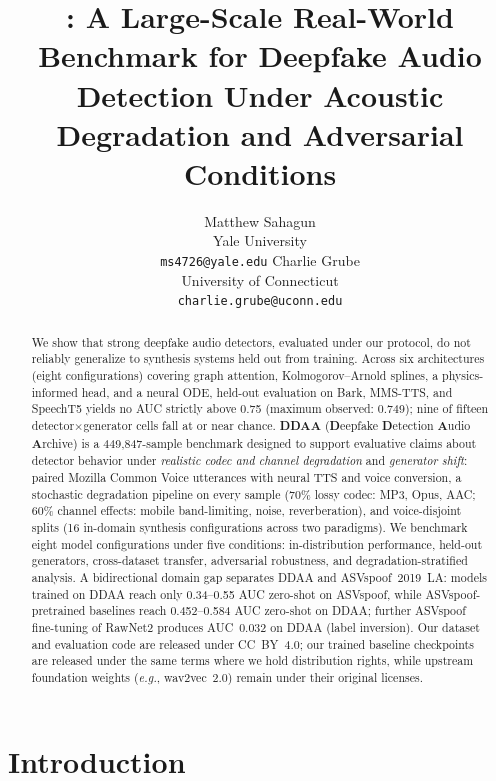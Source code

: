 \documentclass{article}
\title{\ddaa: A Large-Scale Real-World Benchmark for Deepfake Audio\\
  Detection Under Acoustic Degradation and Adversarial Conditions}
\author{%
  Matthew Sahagun \\
  Yale University \\
  \texttt{ms4726@yale.edu}
  \And
  Charlie Grube \\
  University of Connecticut \\
  \texttt{charlie.grube@uconn.edu}
}
\newcommand{\ddaa}{\textsc{DDAA}}
\begin{document}
\maketitle

\begin{abstract}
We show that strong deepfake audio detectors, evaluated under our protocol,
do not reliably generalize to synthesis systems held out from training.
Across six architectures (eight configurations) covering graph attention,
Kolmogorov--Arnold splines, a physics-informed head, and a neural ODE,
held-out evaluation on Bark, MMS-TTS, and SpeechT5 yields no AUC strictly
above 0.75 (maximum observed: 0.749); nine of fifteen
detector$\times$generator cells fall at or near chance.
\textbf{\ddaa} (\textbf{D}eepfake \textbf{D}etection \textbf{A}udio \textbf{A}rchive)
is a 449,847-sample benchmark designed to support evaluative claims about
detector behavior under \emph{realistic codec and channel degradation} and
\emph{generator shift}: paired Mozilla Common Voice utterances with neural TTS
and voice conversion, a stochastic degradation pipeline on every sample
(70\% lossy codec: MP3, Opus, AAC; 60\% channel effects: mobile band-limiting,
noise, reverberation), and voice-disjoint splits (16 in-domain synthesis
configurations across two paradigms).
We benchmark eight model configurations under five conditions:
in-distribution performance, held-out generators, cross-dataset transfer,
adversarial robustness, and degradation-stratified analysis.
A bidirectional domain gap separates \ddaa{} and ASVspoof~2019~LA: models
trained on \ddaa{} reach only 0.34--0.55 AUC zero-shot on ASVspoof, while
ASVspoof-pretrained baselines reach 0.452--0.584 AUC zero-shot on \ddaa{};
further ASVspoof fine-tuning of RawNet2 produces AUC~0.032 on \ddaa{}
(label inversion).
Our dataset and evaluation code are released under CC~BY~4.0; our trained
baseline checkpoints are released under the same terms where we hold
distribution rights, while upstream foundation weights (\textit{e.g.}, wav2vec~2.0)
remain under their original licenses.
\end{abstract}

\section{Introduction}
\label{sec:intro}
\end{document}
